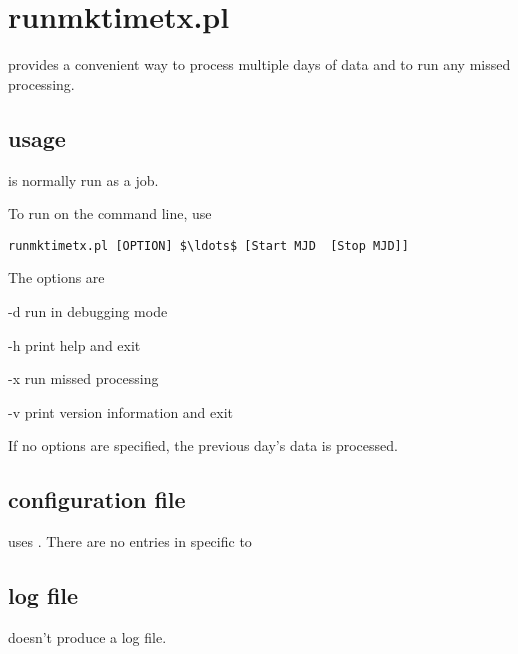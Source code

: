 
\section{runmktimetx.pl \label{runmktimetx}}

\hypertarget{h:runmktimetx}{}

 provides a convenient way to process multiple days of data and to run any missed processing.

	
\subsection{usage}
 is normally run as a  job.

To run  on the command line, use
\begin{lstlisting}[mathescape=true]
runmktimetx.pl [OPTION] $\ldots$ [Start MJD  [Stop MJD]]
\end{lstlisting}

The options are
\begin{description*}
	\item[-d]	run in debugging mode
	\item[-h]	print help and exit
	\item[-x] run missed processing
	\item[-v]	print version information and exit
\end{description*}

If no options are specified, the previous day's data is processed.

\subsection{configuration file}
 uses . There are no entries in  specific to 

\subsection{log file}
 doesn't produce a log file.